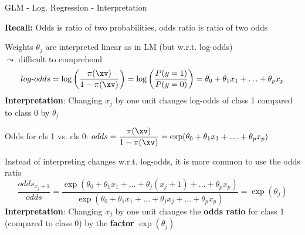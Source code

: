 \documentclass[10pt,compress,t,notes=noshow, xcolor=table]{beamer}
\begin{document}
\begin{framev}[align=top]{GLM - Log. Regression - Interpretation}
\begin{itemizeM}
\item \textbf{Recall:} Odds is ratio of two probabilities, odds ratio is ratio of two odds
\item Weights $\theta_j$ are interpreted linear as in LM (but w.r.t. log-odds)\\
$\leadsto$ difficult to comprehend
$$log\text{-}odds = \log\left(\frac{\pi(\xv)}{1 - \pi(\xv)}\right) = \log\left(\frac{P(y = 1)}{P(y = 0)}\right) = \theta_0 + \theta_1 x_1 + \ldots + \theta_p x_p$$
\textbf{Interpretation}: Changing $x_j$ by one unit changes log-odds of class 1 compared to class 0 by $\theta_j$
\pause
\item Odds for cls 1 vs. cls 0: %
$odds = \displaystyle\frac{\pi(\xv)}{1 - \pi(\xv)}= \exp(\theta_0 + \theta_1 x_1 + \ldots + \theta_p x_p)$
\item Instead of interpreting changes w.r.t. log-odds, it is more common to use the odds ratio
$$\frac{odds_{x_j+1}}{odds} = \frac{\exp(\theta_0 + \theta_1 x_1 + \ldots + \theta_j(x_j + 1) + \ldots + \theta_p x_p)}{\exp(\theta_0 + \theta_1 x_1 + \ldots + \theta_j x_j + \ldots + \theta_p x_p)} = \exp(\theta_j)$$
\textbf{Interpretation}: Changing $x_j$ by one unit changes the \textbf{odds ratio} for class 1 (compared to class 0) by the \textbf{factor} $\exp(\theta_j)$
\end{itemizeM}
\end{framev}
\end{document}
